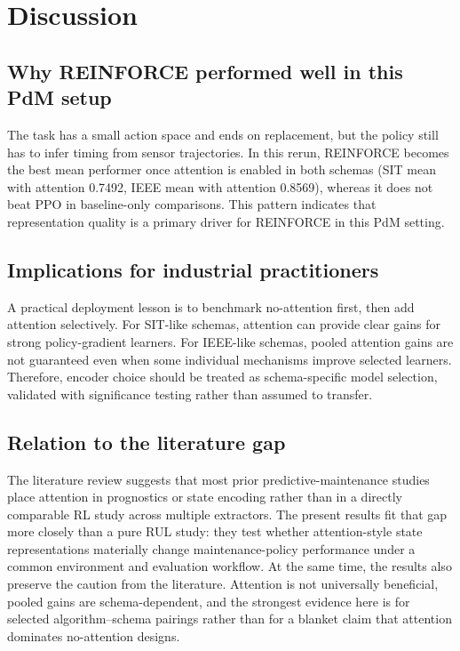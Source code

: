 \documentclass[sn-basic]{sn-jnl}%
\begin{document}
\section{Discussion}
\label{sec:discussion}
\subsection{Why REINFORCE performed well in this PdM setup}
The task has a small action space and ends on replacement, but the policy still has to infer timing from sensor trajectories. In this rerun, \textsc{REINFORCE} becomes the best mean performer once attention is enabled in both schemas (SIT mean with attention 0.7492, IEEE mean with attention 0.8569), whereas it does not beat \textsc{PPO} in baseline-only comparisons. This pattern indicates that representation quality is a primary driver for \textsc{REINFORCE} in this PdM setting.

\subsection{Implications for industrial practitioners}
A practical deployment lesson is to benchmark no-attention first, then add attention selectively. For SIT-like schemas, attention can provide clear gains for strong policy-gradient learners. For IEEE-like schemas, pooled attention gains are not guaranteed even when some individual mechanisms improve selected learners. Therefore, encoder choice should be treated as schema-specific model selection, validated with significance testing rather than assumed to transfer.

\subsection{Relation to the literature gap}
The literature review suggests that most prior predictive-maintenance studies place attention in prognostics or state encoding rather than in a directly comparable RL study across multiple extractors. The present results fit that gap more closely than a pure RUL study: they test whether attention-style state representations materially change maintenance-policy performance under a common environment and evaluation workflow. At the same time, the results also preserve the caution from the literature. Attention is not universally beneficial, pooled gains are schema-dependent, and the strongest evidence here is for selected algorithm--schema pairings rather than for a blanket claim that attention dominates no-attention designs.
\end{document}
